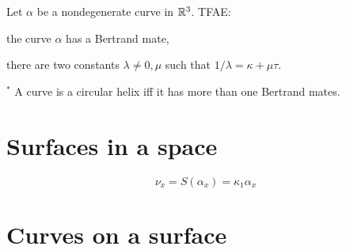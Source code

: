 \documentclass{../exp}
\def\a{\alpha}
\begin{document}
\begin{ex}
Let $\a$ be a nondegenerate curve in $\mathbb{R}^3$.
TFAE:
\begin{cond}
\item the curve $\a$ has a Bertrand mate,
\item there are two constants $\lambda\ne0,\mu$ such that $1/\lambda=\kappa+\mu\tau$.
\end{cond}
$^*$ A curve is a circular helix iff it has more than one Bertrand mates.
\end{ex}



















\section{Surfaces in a space}
\[\nu_x=S(\alpha_x)=\kappa_1\alpha_x\]


\section{Curves on a surface}
\end{document}
